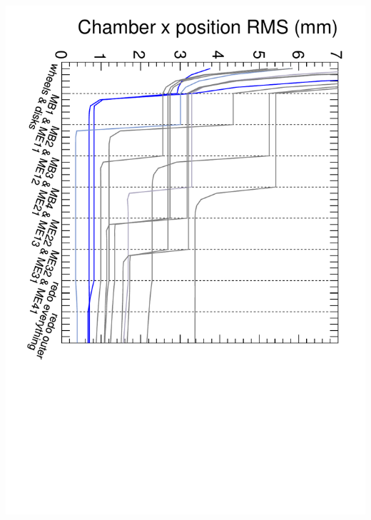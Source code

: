 \documentclass[compress]{beamer}
\begin{document}
\begin{frame}
\begin{columns}
\vspace{-0.25 cm}
\includegraphics[height=\linewidth, angle=90]{convergence-100.pdf}
\end{columns}
\end{frame}
\end{document}
